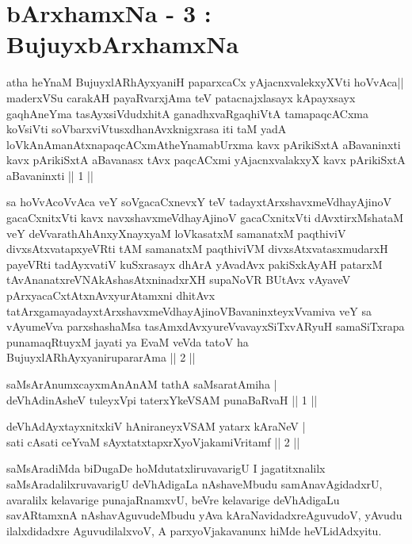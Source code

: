 


\chapter{bArxhamxNa - 3 : BujuyxbArxhamxNa}


\begin{kandikeshl}
atha heYnaM BujuyxlARhAyxyaniH paparxcaCx yAjacnxvalekxyXVti hoVvAca|| maderxVSu carakAH payaRvarxjAma teV patacnajxlasayx kApayxsayx gaqhAneYma tasAyxsiVdudxhitA ganadhxvaRgaqhiVtA tamapaqcACxma koV\s siVti soV\s barxviVtusx\-dhanAvxknigxrasa iti taM yadA loVkAnAmanAtxnapaqcACxmAtheYnamabUrxma kavx pArikiSxtA aBavaninxti kavx pArikiSxtA aBavanasx tAvx paqcACxmi yAjacnxvalakxyX kavx pArikiSxtA aBavaninxti || 1 ||

sa hoVvAcoVvAca veY soV\s gacaCxnevxY teV tadayxtArxshavxmeVdhayAjinoV gacaCxnitxVti kavx navxshavxmeVdhayAjinoV gacaCxnitxVti dAvxtirxMshataM veY deVvarathA\-\break hAnxyXnayxyaM loVkasatxM samanatxM paqthiviV divxsAtxvatapxyeVRti tAM samanatxM paqthiviVM divxsAtxvatasxmudarxH payeVRti tadAyxvatiV kuSxrasayx dhArA yAvadAvx pakiSxkAyAH patarxM tAvAnanatxreVNAkAshasAtxninadxrXH supaNoVR BUtAvx vAyaveV pArxyacaCxtAtxnAvxyurAtamxni dhitAvx tatArxgamayadayxtArxshavxmeVdhayAjinoV\s BavaninxteyxVvamiva veY sa vAyumeVva parxshashaMsa tasAmxdAvxyureVva\break vayxSiTxvARyuH samaSiTxrapa punamaqRtuyxM jayati ya EvaM veVda tatoV ha BujuyxlARhAyxyanirupararAma || 2 ||
\end{kandikeshl}
\vskip 13pt
\begin{shl}
saMsArAnumxcayxmAnAnAM tathA saMsaratAmiha |\\
deVhAdinAsheV tuleyxV\s pi taterxYkeVSAM punaBaRvaH \hfill || 1 ||
\end{shl}

\begin{shl}
deVhAdAyxtayxnitxkiV hAniraneyxVSAM yatarx kAraNeV |\\
sati cAsati ceYvaM sAyxtatxtapxrXyoVjakamiVritamf \hfill || 2 ||
\end{shl}

\begin{artha}
saMsAradiMda biDugaDe hoMdutatxliruvavarigU I jagatitxnalilx saMsAradalilxruvavarigU deVhAdigaLa nAshaveMbudu samAnavAgidadxrU, avaralilx kelavarige punajaRnamxvU, beVre kelavarige deVhAdigaLu savARtamxnA nAshavAguvudeMbudu yAva kAraNavidadxre\break AguvudoV, yAvudu ilalxdidadxre AguvudilalxvoV, A parxyoVjakavanunx hiMde heVLidAdxyitu.
\end{artha}


